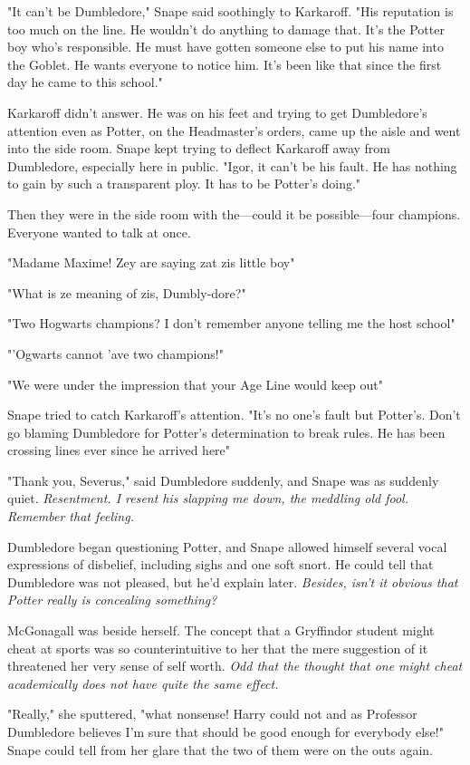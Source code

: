 "It can't be Dumbledore," Snape said soothingly to Karkaroff. "His reputation is too much on the line. He wouldn't do anything to damage that. It's the Potter boy who's responsible. He must have gotten someone else to put his name into the Goblet. He wants everyone to notice him. It's been like that since the first day he came to this school."

Karkaroff didn't answer. He was on his feet and trying to get Dumbledore's attention even as Potter, on the Headmaster's orders, came up the aisle and went into the side room. Snape kept trying to deflect Karkaroff away from Dumbledore, especially here in public. "Igor, it can't be his fault. He has nothing to gain by such a transparent ploy. It has to be Potter's doing."

Then they were in the side room with the—could it be possible—four champions. Everyone wanted to talk at once.

"Madame Maxime! Zey are saying zat zis little boy{\el}"

"What is ze meaning of zis, Dumbly-dore?"

"Two Hogwarts champions? I don't remember anyone telling me the host school{\el}"

"'Ogwarts cannot 'ave two champions!"

"We were under the impression that your Age Line would keep out{\el}"

Snape tried to catch Karkaroff's attention. "It's no one's fault but Potter's. Don't go blaming Dumbledore for Potter's determination to break rules. He has been crossing lines ever since he arrived here{\el}"

"Thank you, Severus," said Dumbledore suddenly, and Snape was as suddenly quiet. \emph{Resentment. I resent his slapping me down, the meddling old fool. Remember that feeling.}

Dumbledore began questioning Potter, and Snape allowed himself several vocal expressions of disbelief, including sighs and one soft snort. He could tell that Dumbledore was not pleased, but he'd explain later. \emph{Besides, isn't it obvious that Potter really is concealing something?}

McGonagall was beside herself. The concept that a Gryffindor student might cheat at sports was so counterintuitive to her that the mere suggestion of it threatened her very sense of self worth. \emph{Odd that the thought that one might cheat academically does not have quite the same effect.}

"Really," she sputtered, "what nonsense! Harry could not{\el} and as Professor Dumbledore believes{\el} I'm sure that should be good enough for everybody else!" Snape could tell from her glare that the two of them were on the outs again.


